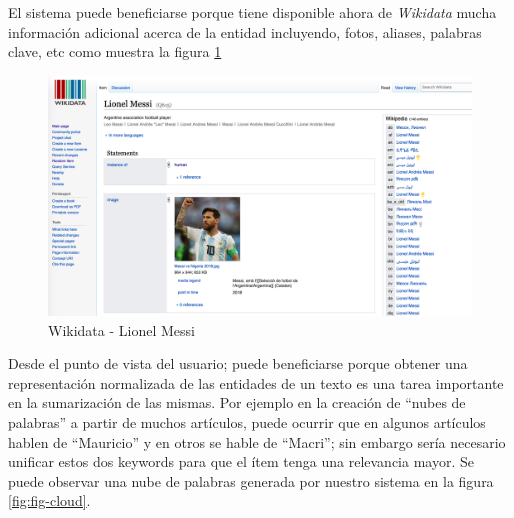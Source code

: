 \documentclass[12pt,a4paper,]{scrartcl}
\begin{document}
El sistema puede beneficiarse porque tiene disponible ahora de \emph{Wikidata} mucha información adicional acerca de la entidad incluyendo, fotos, aliases, palabras clave, etc como muestra la figura \ref{fig:fig-messi}

\begin{figure}[H]

{\centering \includegraphics{assets/wikidata_messi.pdf} 

}

\caption{Wikidata - Lionel Messi}\label{fig:fig-messi}
\end{figure}

Desde el punto de vista del usuario; puede beneficiarse porque obtener una representación normalizada de las entidades de un texto es una tarea importante en la sumarización de las mismas. Por ejemplo en la creación de \enquote{nubes de palabras} a partir de muchos artículos, puede ocurrir que en algunos artículos hablen de \enquote{Mauricio} y en otros se hable de \enquote{Macri}; sin embargo sería necesario unificar estos dos keywords para que el ítem tenga una relevancia mayor. Se puede observar una nube de palabras generada por nuestro sistema en la figura \ref{fig:fig-cloud}.
\end{document}
